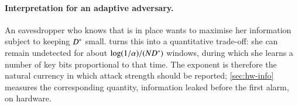 \paragraph{Interpretation for an adaptive adversary.} An eavesdropper who knows that \qtrace{} is in place wants to maximise her information subject to keeping $D^{\ast}$ small.  turns this into a quantitative trade-off: she can remain undetected for about $\log(1/\alpha)/(ND^{\ast})$ windows, during which she learns a number of key bits proportional to that time. The exponent is therefore the natural currency in which attack strength should be reported; \cref{sec:hw-info} measures the corresponding quantity, information leaked before the first alarm, on hardware.
